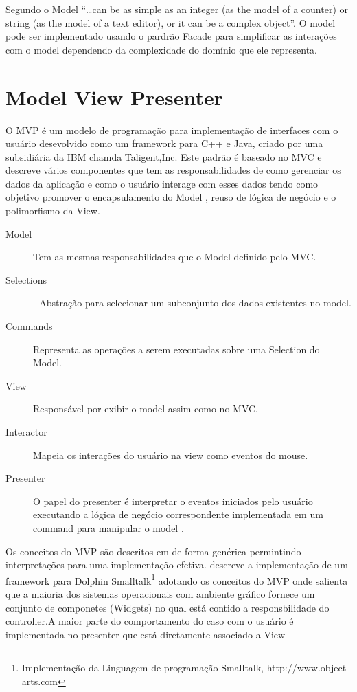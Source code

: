 Segundo  o Model ``\ldots can be as simple as an integer
(as the model of a counter) or string (as the model of a text editor), or it can
be a complex object''. O model pode ser implementado usando o pardrão Facade
para simplificar as interações com o model dependendo da complexidade do
domínio que ele representa.



\section{Model View Presenter}

O MVP é um modelo de programação para implementação de interfaces com o usuário
desevolvido como um framework para C++ e Java, criado por uma subsidiária da IBM
chamda Taligent,Inc. Este padrão é baseado no MVC e descreve vários componentes que tem as
responsabilidades de como gerenciar os dados da aplicação e como o usuário
interage com esses dados tendo como objetivo promover o encapsulamento do Model
, reuso de lógica de negócio e o polimorfismo da View.

\begin{description}
  \item[Model] Tem as mesmas responsabilidades que o Model definido pelo MVC.
  \item[Selections] - Abstração para selecionar um subconjunto dos dados
  existentes no model.
  \item [Commands] Representa as operações a serem executadas sobre uma
  Selection do Model.
  \item [View] Responsável por exibir o model assim como no MVC.
  \item [Interactor] Mapeia os interações do usuário na view como eventos do
  mouse.
  \item [Presenter] O papel do presenter é interpretar o eventos iniciados pelo
  usuário executando a lógica de negócio correspondente implementada em um
  command para manipular o model \cite{Potel96mvp}.
\end{description}


Os conceitos do MVP são descritos em  de forma genérica
permintindo interpretações para uma implementação efetiva.
 descreve a implementação de um framework para
Dolphin Smalltalk\footnote{Implementação da Linguagem de programação Smalltalk,
http://www.object-arts.com} adotando os conceitos do MVP onde salienta que a
maioria dos sistemas operacionais com ambiente gráfico fornece um conjunto de
componetes (Widgets) no qual está contido a responsbilidade do controller.A
maior parte do comportamento do caso com o usuário é implementada no
presenter que está diretamente associado a View

